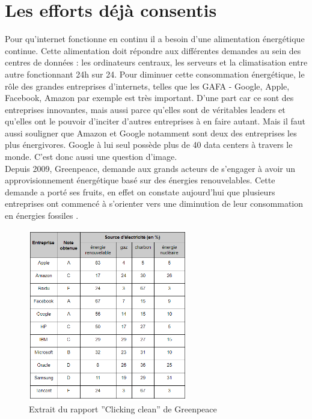 \documentclass[a4paper,twocolumn,12pt]{article}
\begin{document}
\section{Les efforts déjà consentis}

	Pour qu’internet fonctionne en continu il a besoin d’une alimentation énergétique continue. Cette alimentation doit répondre aux différentes demandes au sein des centres de données : les ordinateurs centraux, les serveurs et la climatisation entre autre fonctionnant 24h sur 24. Pour diminuer cette consommation énergétique, le rôle des grandes entreprises d’internets, telles que les GAFA - Google, Apple, Facebook, Amazon par exemple est très important. D’une part car ce sont des entreprises innovantes, mais aussi parce qu’elles sont de véritables leaders et qu’elles ont le pouvoir d’inciter d’autres entreprises à en faire autant. Mais il faut aussi souligner que Amazon et Google notamment sont deux des entreprises les plus énergivores. Google à lui seul possède plus de 40 data centers à travers le monde. C’est donc aussi une question d’image. \\ 

	Depuis 2009, Greenpeace, demande aux grands acteurs de s’engager à avoir un approvisionnement énergétique basé sur des énergies renouvelables. Cette demande a porté ses fruits, en effet on constate aujourd’hui que plusieurs entreprises ont commencé à s’orienter vers une diminution de leur consommation en énergies fossiles \cite{3}. \\

\begin{figure}[!h]	
\centerline{\includegraphics[height=7.5cm]{picture/tableauGreenpeace.png}}
\caption{Extrait du rapport ''Clicking clean'' de Greenpeace}
\label{tableauGreenpeace}
\end{figure}	
\end{document}
